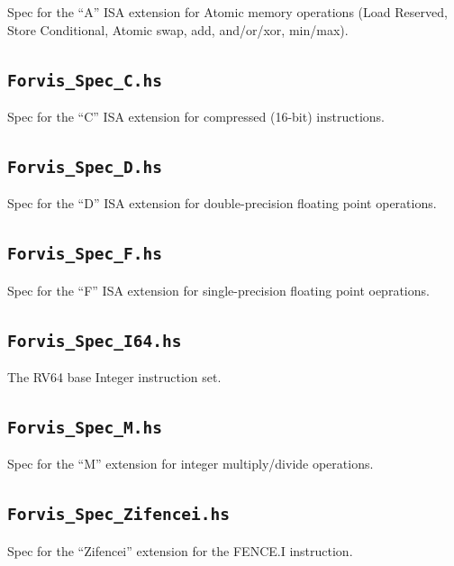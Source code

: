 \documentclass[11pt]{article}
\begin{document}
Spec for the ``A'' ISA extension for Atomic memory
operations (Load Reserved, Store Conditional, Atomic swap, add,
and/or/xor, min/max).


\subsection{\tt Forvis\_Spec\_C.hs}

Spec for the ``C'' ISA extension for compressed (16-bit) instructions.


\subsection{\tt Forvis\_Spec\_D.hs}

Spec for the ``D'' ISA extension for double-precision floating point operations.


\subsection{\tt Forvis\_Spec\_F.hs}

Spec for the ``F'' ISA extension for single-precision floating point oeprations.


\subsection{\tt Forvis\_Spec\_I64.hs}

The RV64 base Integer instruction set.


\subsection{\tt Forvis\_Spec\_M.hs}

Spec for the ``M'' extension for integer multiply/divide operations.


\subsection{\tt Forvis\_Spec\_Zifencei.hs}

Spec for the ``Zifencei'' extension for the FENCE.I instruction.
\end{document}
